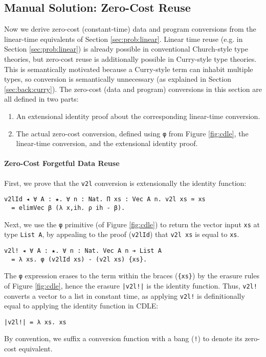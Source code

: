 \documentclass[acmsmall]{acmart}\settopmatter{}
\newcommand{\refsec}[1]{Section \ref{sec:#1}}
\newcommand{\labsec}[1]{\label{sec:#1}}
\newcommand{\reffig}[1]{Figure \ref{fig:#1}}
\begin{document}
\subsection{Manual Solution: Zero-Cost Reuse}
\labsec{prob:manual}

Now we derive zero-cost (constant-time) data and program conversions
from the linear-time equivalents of \refsec{prob:linear}.
Linear time reuse
(e.g. in \refsec{prob:linear}) is already possible in conventional
Church-style type theories, but zero-cost reuse is additionally
possible in Curry-style type theories. This is semantically motivated
because a Curry-style term can inhabit multiple types,
so conversion is semantically unnecessary
(as explained in \refsec{back:curry}).
The zero-cost (data and program) conversions in this section
are all defined in two parts:
\begin{enumerate}
\item An extensional identity proof about the corresponding linear-time conversion.
\item The actual zero-cost conversion, defined using \verb;φ; from
  \reffig{cdle}, the linear-time conversion, and the extensional
  identity proof.
\end{enumerate}

\paragraph{Zero-Cost Forgetful Data Reuse}

First, we prove that the \verb;v2l; conversion is extensionally the
identity function:
\begin{verbatim}
v2lId ◂ ∀ A : ★. ∀ n : Nat. Π xs : Vec A n. v2l xs ≃ xs 
  = elimVec β (λ x,ih. ρ ih - β).
\end{verbatim}
Next, we use the \verb;φ; primitive (of \reffig{cdle}) to return the
vector input \verb;xs; at type \verb;List A;, by appealing to the
proof (\verb;v2lId;) that \verb;v2l xs; is equal to \verb;xs;.
\begin{verbatim}
v2l! ◂ ∀ A : ★. ∀ n : Nat. Vec A n ➔ List A
  = λ xs. φ (v2lId xs) - (v2l xs) {xs}.
\end{verbatim}
The \verb;φ; expression erases to the term within the braces
(\verb;{xs};) by the erasure rules of \reffig{cdle}, hence
the erasure \verb;|v2l!|; is the identity function.
Thus, \verb;v2l!; converts a vector to a list in
constant time, as applying \verb;v2l!; is definitionally equal to
applying the identity function in CDLE:
\begin{verbatim}
|v2l!| = λ xs. xs
\end{verbatim}
By convention, we suffix a
conversion function with a bang (\verb;!;) to denote its zero-cost
equivalent.
\end{document}
